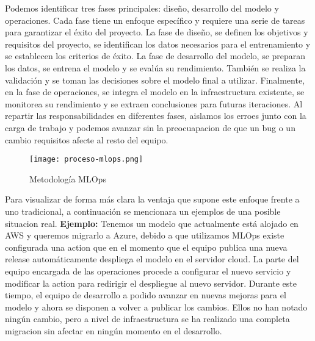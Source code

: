     Podemos identificar tres fases principales: diseño, desarrollo del modelo y operaciones. Cada fase tiene un enfoque
    específico y requiere una serie de tareas para garantizar el éxito del proyecto. La fase de diseño, 
    se definen los objetivos y requisitos del proyecto, se identifican los datos necesarios para el entrenamiento y 
    se establecen los criterios de éxito. La fase de desarrollo del modelo, se preparan los datos, se entrena el modelo 
    y se evalúa su rendimiento. También se realiza la validación y se toman las decisiones sobre el modelo final a utilizar. 
    Finalmente, en la fase de operaciones, se integra el modelo en la infraestructura existente, se monitorea su rendimiento
    y se extraen conclusiones para futuras iteraciones. Al repartir las responsabilidades en diferentes fases, aislamos los erroes junto con la carga de trabajo y podemos avanzar 
    sin la preocuapacion de que un bug o un cambio requisitos afecte al resto del equipo. 
    
    \begin{figure}[ht]
        \centering
        \texttt{[image: proceso-mlops.png]}
        \caption{Metodología MLOps}
        \label{fig:proces-mlops}
    \end{figure}

    Para visualizar de forma más clara la ventaja que supone este enfoque frente a uno tradicional, a continuación 
    se mencionara un ejemplos de una posible situacion real. \textbf{Ejemplo:} Tenemos un modelo que actualmente está alojado en AWS y queremos migrarlo a Azure, debido a que
    utilizamos MLOps existe configurada una action que en el momento que el equipo publica una nueva release
    automáticamente despliega el modelo en el servidor cloud. La parte del equipo encargada de las operaciones procede
    a configurar el nuevo servicio y modificar la action para redirigir el despliegue al nuevo servidor. Durante este
    tiempo, el equipo de desarrollo a podido avanzar en nuevas mejoras para el modelo y ahora se disponen a volver
    a publicar los cambios. Ellos no han notado ningún cambio, pero a nivel de infraestructura se ha realizado una 
    completa migracion sin afectar en ningún momento en el desarrollo.


\pagebreak